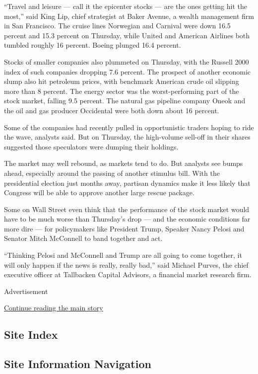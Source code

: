 ``Travel and leisure --- call it the epicenter stocks --- are the ones
getting hit the most,'' said King Lip, chief strategist at Baker Avenue,
a wealth management firm in San Francisco. The cruise lines Norwegian
and Carnival were down 16.5 percent and 15.3 percent on Thursday, while
United and American Airlines both tumbled roughly 16 percent. Boeing
plunged 16.4 percent.

Stocks of smaller companies also plummeted on Thursday, with the Russell
2000 index of such companies dropping 7.6 percent. The prospect of
another economic slump also hit petroleum prices, with benchmark
American crude oil slipping more than 8 percent. The energy sector was
the worst-performing part of the stock market, falling 9.5 percent. The
natural gas pipeline company Oneok and the oil and gas producer
Occidental were both down about 16 percent.

Some of the companies had recently pulled in opportunistic traders
hoping to ride the wave, analysts said. But on Thursday, the high-volume
sell-off in their shares suggested those speculators were dumping their
holdings.

The market may well rebound, as markets tend to do. But analysts see
bumps ahead, especially around the passing of another stimulus bill.
With the presidential election just months away, partisan dynamics make
it less likely that Congress will be able to approve another large
rescue package.

Some on Wall Street even think that the performance of the stock market
would have to be much worse than Thursday's drop --- and the economic
conditions far more dire --- for policymakers like President Trump,
Speaker Nancy Pelosi and Senator Mitch McConnell to band together and
act.

``Thinking Pelosi and McConnell and Trump are all going to come
together, it will only happen if the news is really, really bad,'' said
Michael Purves, the chief executive officer at Tallbacken Capital
Advisors, a financial market research firm.

Advertisement

\protect\hyperlink{after-bottom}{Continue reading the main story}

\hypertarget{site-index}{%
\subsection{Site Index}\label{site-index}}

\hypertarget{site-information-navigation}{%
\subsection{Site Information
Navigation}\label{site-information-navigation}}

